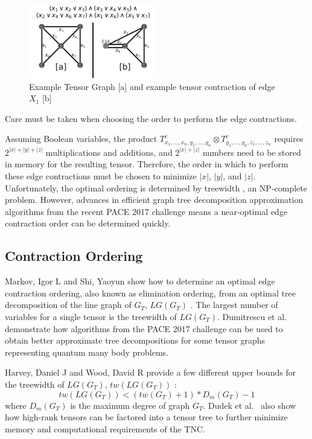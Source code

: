 \documentclass[12pt,twocolumn]{article}
\begin{document}
\begin{figure}[t]
\caption{Example Tensor Graph [a] and example tensor contraction of edge $X_1$ [b]}
\label{fig:Tensor Graph Example}
\includegraphics[width=0.5\textwidth]{../figures/TensorGraphExample.png}
\end{figure}

Care must be taken when choosing the order to perform the edge contractions.

Assuming Boolean variables, the product \(T^c_{x_1,...,x_n,y_1,...,y_n} \otimes T^c_{y_1,...,y_n,z_1,...,z_n}\) requires \(2^{|x|+|y|+|z|}\) multiplications and additions, and \(2^{|x|+|z|}\) numbers need to be stored in memory for the resulting tensor. Therefore, the order in which to perform these edge contractions must be chosen to minimize \(|x|\), \(|y|\), and \(|z|\). Unfortunately, the optimal ordering is determined by treewidth \cite{markov2008simulating}, an NP-complete problem. However, advances in efficient graph tree decomposition approximation algorithms from the recent PACE 2017 challenge \cite{dell2018pace} means a near-optimal edge contraction order can be determined quickly.

\hypertarget{contraction-ordering}{%
\subsection{Contraction Ordering}\label{contraction-ordering}}

Markov, Igor L and Shi, Yaoyun show how to determine an optimal edge contraction ordering, also known as elimination ordering, from an optimal tree decomposition of the line graph of \(G_T\), \(LG(G_T)\) \cite{markov2008simulating}. The largest number of variables for a single tensor is the treewidth of \(LG(G_T)\). Dumitrescu et al.~\cite{dumitrescu2018benchmarking} demonstrate how algorithms from the PACE 2017 challenge \cite{dell2018pace} can be used to obtain better approximate tree decompositions for some tensor graphs representing quantum many body problems.

Harvey, Daniel J and Wood, David R provide a few different upper bounds for the treewidth of \(LG(G_T)\), \(tw(LG(G_T))\) \cite{harvey2018treewidth}: \begin{equation*}
tw(LG(G_T))<(tw(G_T)+1)*D_m(G_T)-1
\end{equation*} where \(D_m(G_T)\) is the maximum degree of graph \(G_T\). Dudek et al.~\cite{dudek2019efficient} also show how high-rank tensors can be factored into a tensor tree to further minimize memory and computational requirements of the TNC.
\end{document}
